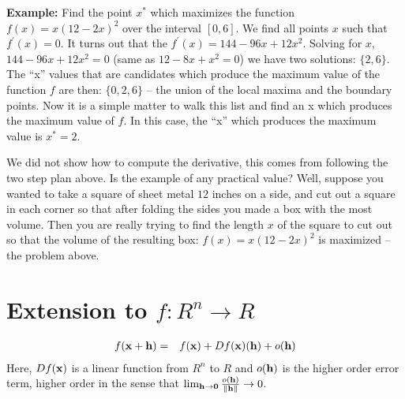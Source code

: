 \documentclass{article}
\begin{document}
{\bf Example:\/} Find the point $x^*$ which maximizes the function $f(x) = x(12 - 2x)^2$
over the interval $[0,6]$. We find all points $x$ such that $f^\prime(x) = 0$.
It turns out that the $f^\prime(x) = 144 - 96x + 12x^2$. Solving for $x$,
$144 - 96x + 12x^2 = 0$ (same as $12 - 8x + x^2 = 0$) we have two solutions: $\{2, 6\}$.
The ``x''{} values that are candidates which produce the maximum value of the function $f$
are then: $\{0, 2, 6\}$ -- the union of the local maxima and the boundary points.
Now it is a simple matter to walk this list and find an x which produces the maximum
value of $f$. In this case, the ``x''{} which produces the maximum value is $x^* = 2$.

We did not show how to compute the derivative, this comes from following the two
step plan above. Is the example of any practical value? Well, suppose you wanted
to take a square of sheet metal $12$ inches on a side, and cut out a square in each
corner so that after folding the sides you made a box with the most volume. Then
you are really trying to find the length $x$ of the square to cut out so that the
volume of the resulting box: $f(x) = x(12 - 2 x)^2$ is maximized -- the problem
above.




\section{Extension to $f:R^n \rightarrow R$}
\begin{eqnarray}
  f({\bf x} + {\bf h}) & = & f({\bf x}) + Df({\bf x})({\bf h}) + o({\bf h}) \label{vderdef}
\end{eqnarray}
Here, $Df({\bf x})$ is a linear function from $R^n$ to $R$ and
$o({\bf h})$ is the higher order error term, higher order in the sense that
$\lim_{{\bf h} \rightarrow {\bf 0}}\frac{o({\bf h})}{\|{\bf h}\|} \rightarrow 0$.
\end{document}
